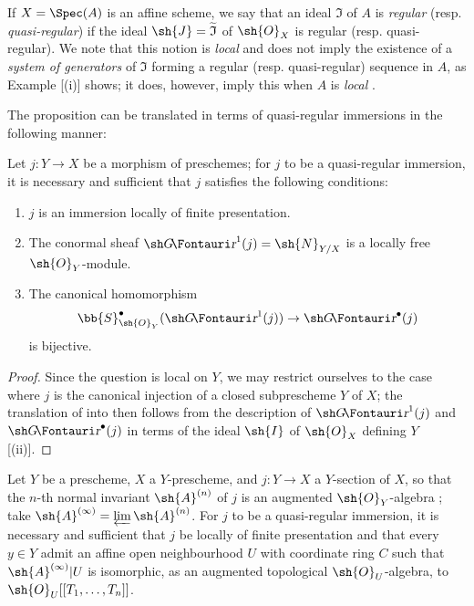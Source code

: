 \begin{env}[16.9.7]
\label{IV.16.9.7}
If $X = \Spec(A)$ is an affine scheme, we say that an ideal $\mathfrak{I}$ of $A$ is \emph{regular} (resp. \emph{quasi-regular}) if the ideal $\sh{J} = \widetilde{\mathfrak{I}}$ of $\sh{O}_X$ is regular (resp. quasi-regular).
We note that this notion is \emph{local} and does not imply the existence of a \emph{system of generators} of $\mathfrak{I}$ forming a regular (resp. quasi-regular) sequence in $A$, as Example [(i)] shows;
it does, however, imply this when $A$ is \emph{local} .

The proposition  can be translated in terms of quasi-regular immersions in the following manner:
\end{env}

\begin{proposition}[16.9.8]
\label{IV.16.9.8}
Let $j:Y \to X$ be a morphism of preschemes;
for $j$ to be a quasi-regular immersion, it is necessary and sufficient that $j$ satisfies the following conditions:
\begin{enumerate}
  \item[(i)] $j$ is an immersion locally of finite presentation.
  \item[(ii)] The conormal sheaf $\shGr^1(j) = \sh{N}_{Y/X}$  is a locally free $\sh{O}_Y$-module.
  \item[(iii)] The canonical homomorphism
  \[
    \bb{S}_{\sh{O}_Y}^\bullet(\shGr^1(j)) \to \shGr^\bullet(j)
  \]
   is bijective.
\end{enumerate}
\end{proposition}

\begin{proof}
Since the question is local on $Y$, we may restrict ourselves to the case where $j$ is the canonical injection of a closed subprescheme $Y$ of $X$; the translation of  into  then follows from the description of $\shGr^1(j)$ and $\shGr^\bullet(j)$ in terms of the ideal $\sh{I}$ of $\sh{O}_X$ defining $Y$ [(ii)].
\end{proof}

\begin{corollary}[16.9.9]
\label{IV.16.9.9}
Let $Y$ be a prescheme, $X$ a $Y$-prescheme, and $j:Y \to X$ a $Y$-section of $X$, so that the $n$-th normal invariant $\sh{A}^{(n)}$ of $j$  is an augmented $\sh{O}_Y$-algebra ;
take $\sh{A}^{(\infty)} = \varprojlim \sh{A}^{(n)}$.
For $j$ to be a quasi-regular immersion, it is necessary and sufficient that $j$ be locally of finite presentation and that every $y \in Y$ admit an affine open neighbourhood $U$ with coordinate ring $C$ such that $\sh{A}^{(\infty)}|U$ is isomorphic, as an augmented topological $\sh{O}_U$-algebra, to $\sh{O}_U[[T_1, \dots, T_n]]$.
\end{corollary}


